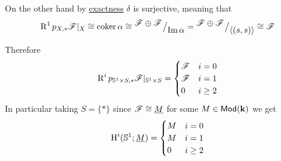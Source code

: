 \documentclass[../../main]{subfiles}
\begin{document}
\begin{example}[\(\mathbb{S}^{1}\)]
  On the other hand by \hyperref[def:exact-sequence]{exactness} \(\delta\) is surjective, meaning that
  \begin{equation*}
    \operatorname{R}^{1}p_{X, \ast}\mathscr{F}|_{X} \cong \operatorname*{coker} \alpha \cong {^{\textstyle \mathscr{F} \oplus \mathscr{F}}\big/_{\textstyle \operatorname{Im} \alpha}} = {^{\textstyle \mathscr{F} \oplus \mathscr{F}}\big/_{\textstyle \langle(s, s)\rangle}} \cong \mathscr{F}
  \end{equation*}

  Therefore
  \begin{equation*}
    \operatorname{R}^{i}p_{\mathbb{S}^{1} \times S, \ast}\mathscr{F}|_{\mathbb{S}^{1} \times S} = \begin{cases}
      \mathscr{F} & i = 0 \\
      \mathscr{F} & i = 1 \\
      0 & i \geq 2
    \end{cases}
  \end{equation*}
  In particular taking \(S = \{\ast\}\) since \(\mathscr{F} \cong \underline{M}\) for some \(M \in \mathsf{Mod}(\mathbf{k})\) we get
  \begin{equation*}
    \operatorname{H}^{i}(\mathbb{S}^{1}; \underline{M}) = \begin{cases}
      M & i = 0 \\
      M & i = 1 \\
      0 & i \geq 2
    \end{cases}
  \end{equation*}
\end{example}
\end{document}
